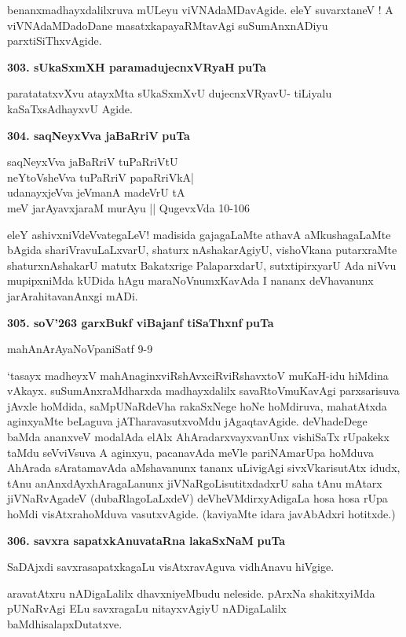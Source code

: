 {benanxmadhayxdalilxruva mULeyu viVNAdaMDavAgide. eleY suvarxtaneV ! A viVNAdaMDadoDane masatxka\-payaRMtavAgi suSumAnxnADiyu parxtiSiThxvAgide.

\medskip
\noindent
\textbf{303. sUkaSxmXH paramadujecnxVRyaH} \hfill {\bf puTa \pageref{40}}

\smallskip
paratatatxvXvu atayxMta sUkaSxmXvU dujecnxVRyavU- tiLiyalu kaSaTxsAdhayxvU Agide.

\medskip
\noindent
\textbf{304. saqNeyxVva jaBaRriV} \hfill {\bf puTa \pageref{page113}}

\begin{shloka}
saqNeyxVva jaBaRriV tuPaRriVtU\\
neYtoVsheVva tuPaRriV papaRriVkA|\\
udanayxjeVva jeVmanA madeVrU tA\\
meV jarAyavxjaraM murAyu || \hfill{QugevxVda 10-106}
\end{shloka}

eleY ashivxniVdeVvategaLeV! madisida gajagaLaMte athavA aMkushagaLaMte bAgida shariVravuLaLxvarU, shaturx nAshakarAgiyU, vishoVkana putarxraMte shaturxnAshakarU matutx Bakatxrige PalaparxdarU, sutxtipirxyarU  Ada niVvu mupipxniMda kUDida hAgu maraNoVnumxKavAda I nananx deVhavanunx jarArahitavanAnxgi mADi.

\medskip
\noindent
\textbf{305. soV\char'263 garxBukf viBajanf tiSaThxnf} \hfill {\bf puTa \pageref{239}}

\hfill mahAnArAyaNoVpaniSatf 9-9

\smallskip
`tasayx madheyxV mahAnaginxviRshAvxciRviRshavxtoV muKaH-idu hiMdina vAkayx. suSumAnxraMdharxda madhayx\-dalilx savaRtoVmuKavAgi parxsarisuva jAvxle hoMdida, saMpUNaRdeVha rakaSxNege hoNe hoMdiruva, maha\-tAtxda aginxyaMte beLaguva jATharavasutxvoMdu jAgaqtavAgide. deVhadeDege baMda ananxveV moda\-lAda elAlx AhAradarxvayxvanUnx vishiSaTx rUpakekx taMdu seVviVsuva A aginxyu, pacanavAda meVle pari\-NAma\-rUpa hoMduva AhArada sAratamavAda aMshavanunx tananx uLivigAgi sivxVkarisutAtx idudx, tAnu anAnxdAyxhAragaLanunx jiVNaRgoLisutitxdadxrU saha tAnu mAtarx jiVNaRvAgadeV (dubaRlagoLaLxdeV) deV\-heVMdirxyAdigaLa hosa hosa rUpa hoMdi visAtxrahoMduva vasutxvAgide. (kaviyaMte idara javA\-bAdxri hotitxde.)

\medskip
\noindent
\textbf{306. savxra sapatxkAnuvataRna lakaSxNaM} \hfill {\bf puTa \pageref{160}}

\smallskip
SaDAjxdi savxrasapatxkagaLu visAtxravAguva vidhAnavu hiVgige.

aravatAtxru nADigaLalilx dhavxniyeMbudu neleside. pArxNa shakitxyiMda pUNaRvAgi ELu savxragaLu nitayx\-vAgiyU nADigaLalilx baMdhisalapxDutatxve.

}
